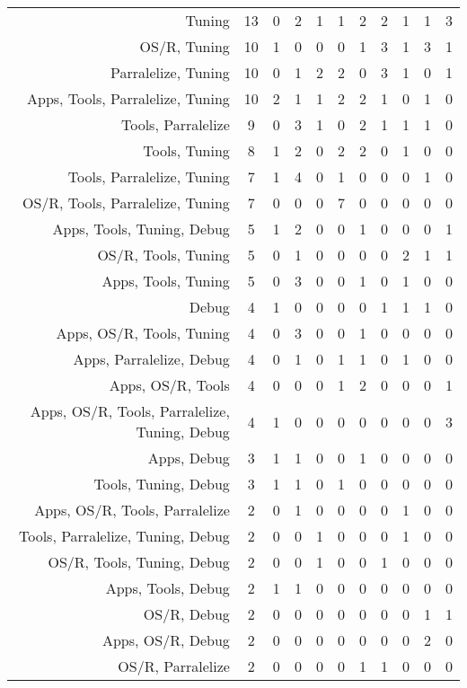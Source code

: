 {\begin{landscape}
\begin{longtable}[htb]{r|c|c|c|c|c|c|c|c|c|c}
{Tuning} & 13 & 0 & 2 & 1 & 1 & 2 & 2 & 1 & 1 & 3 \\%
{OS/R, Tuning} & 10 & 1 & 0 & 0 & 0 & 1 & 3 & 1 & 3 & 1 \\%
{Parralelize, Tuning} & 10 & 0 & 1 & 2 & 2 & 0 & 3 & 1 & 0 & 1 \\%
{Apps, Tools, Parralelize, Tuning} & 10 & 2 & 1 & 1 & 2 & 2 & 1 & 0 & 1 & 0 \\%
{Tools, Parralelize} & 9 & 0 & 3 & 1 & 0 & 2 & 1 & 1 & 1 & 0 \\%
{Tools, Tuning} & 8 & 1 & 2 & 0 & 2 & 2 & 0 & 1 & 0 & 0 \\%
{Tools, Parralelize, Tuning} & 7 & 1 & 4 & 0 & 1 & 0 & 0 & 0 & 1 & 0 \\%
{OS/R, Tools, Parralelize, Tuning} & 7 & 0 & 0 & 0 & 7 & 0 & 0 & 0 & 0 & 0 \\%
{Apps, Tools, Tuning, Debug} & 5 & 1 & 2 & 0 & 0 & 1 & 0 & 0 & 0 & 1 \\%
{OS/R, Tools, Tuning} & 5 & 0 & 1 & 0 & 0 & 0 & 0 & 2 & 1 & 1 \\%
{Apps, Tools, Tuning} & 5 & 0 & 3 & 0 & 0 & 1 & 0 & 1 & 0 & 0 \\%
{Debug} & 4 & 1 & 0 & 0 & 0 & 0 & 1 & 1 & 1 & 0 \\%
{Apps, OS/R, Tools, Tuning} & 4 & 0 & 3 & 0 & 0 & 1 & 0 & 0 & 0 & 0 \\%
{Apps, Parralelize, Debug} & 4 & 0 & 1 & 0 & 1 & 1 & 0 & 1 & 0 & 0 \\%
{Apps, OS/R, Tools} & 4 & 0 & 0 & 0 & 1 & 2 & 0 & 0 & 0 & 1 \\%
{Apps, OS/R, Tools, Parralelize, Tuning, Debug} & 4 & 1 & 0 & 0 & 0 & 0 & 0 & 0 & 0 & 3 \\%
{Apps, Debug} & 3 & 1 & 1 & 0 & 0 & 1 & 0 & 0 & 0 & 0 \\%
{Tools, Tuning, Debug} & 3 & 1 & 1 & 0 & 1 & 0 & 0 & 0 & 0 & 0 \\%
{Apps, OS/R, Tools, Parralelize} & 2 & 0 & 1 & 0 & 0 & 0 & 0 & 1 & 0 & 0 \\%
{Tools, Parralelize, Tuning, Debug} & 2 & 0 & 0 & 1 & 0 & 0 & 0 & 1 & 0 & 0 \\%
{OS/R, Tools, Tuning, Debug} & 2 & 0 & 0 & 1 & 0 & 0 & 1 & 0 & 0 & 0 \\%
{Apps, Tools, Debug} & 2 & 1 & 1 & 0 & 0 & 0 & 0 & 0 & 0 & 0 \\%
{OS/R, Debug} & 2 & 0 & 0 & 0 & 0 & 0 & 0 & 0 & 1 & 1 \\%
{Apps, OS/R, Debug} & 2 & 0 & 0 & 0 & 0 & 0 & 0 & 0 & 2 & 0 \\%
{OS/R, Parralelize} & 2 & 0 & 0 & 0 & 0 & 1 & 1 & 0 & 0 & 0 \\%

\end{longtable}
\end{landscape}}

